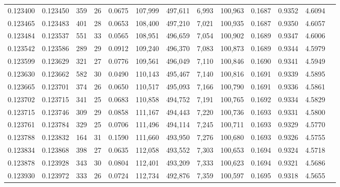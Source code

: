 \begin{tabular}{rrrrrrrrrrrrr}
0.123400 & 0.123450 &   359 &  26 &                                     0.0675 & 107,999 & 497,611 &   6,993 & 100,963 & 0.1687 & 0.9352 & 4.6094 \\
0.123465 & 0.123483 &   401 &  28 &                                     0.0653 & 108,400 & 497,210 &   7,021 & 100,935 & 0.1687 & 0.9350 & 4.6057 \\
0.123484 & 0.123537 &   551 &  33 &                                     0.0565 & 108,951 & 496,659 &   7,054 & 100,902 & 0.1689 & 0.9347 & 4.6006 \\
0.123542 & 0.123586 &   289 &  29 &                                     0.0912 & 109,240 & 496,370 &   7,083 & 100,873 & 0.1689 & 0.9344 & 4.5979 \\
0.123599 & 0.123629 &   321 &  27 &                                     0.0776 & 109,561 & 496,049 &   7,110 & 100,846 & 0.1690 & 0.9341 & 4.5949 \\
0.123630 & 0.123662 &   582 &  30 &                                     0.0490 & 110,143 & 495,467 &   7,140 & 100,816 & 0.1691 & 0.9339 & 4.5895 \\
0.123665 & 0.123701 &   374 &  26 &                                     0.0650 & 110,517 & 495,093 &   7,166 & 100,790 & 0.1691 & 0.9336 & 4.5861 \\
0.123702 & 0.123715 &   341 &  25 &                                     0.0683 & 110,858 & 494,752 &   7,191 & 100,765 & 0.1692 & 0.9334 & 4.5829 \\
0.123715 & 0.123746 &   309 &  29 &                                     0.0858 & 111,167 & 494,443 &   7,220 & 100,736 & 0.1693 & 0.9331 & 4.5800 \\
0.123761 & 0.123784 &   329 &  25 &                                     0.0706 & 111,496 & 494,114 &   7,245 & 100,711 & 0.1693 & 0.9329 & 4.5770 \\
0.123788 & 0.123832 &   164 &  31 &                                     0.1590 & 111,660 & 493,950 &   7,276 & 100,680 & 0.1693 & 0.9326 & 4.5755 \\
0.123834 & 0.123868 &   398 &  27 &                                     0.0635 & 112,058 & 493,552 &   7,303 & 100,653 & 0.1694 & 0.9324 & 4.5718 \\
0.123878 & 0.123928 &   343 &  30 &                                     0.0804 & 112,401 & 493,209 &   7,333 & 100,623 & 0.1694 & 0.9321 & 4.5686 \\
0.123930 & 0.123972 &   333 &  26 &                                     0.0724 & 112,734 & 492,876 &   7,359 & 100,597 & 0.1695 & 0.9318 & 4.5655 \\

\end{tabular}
